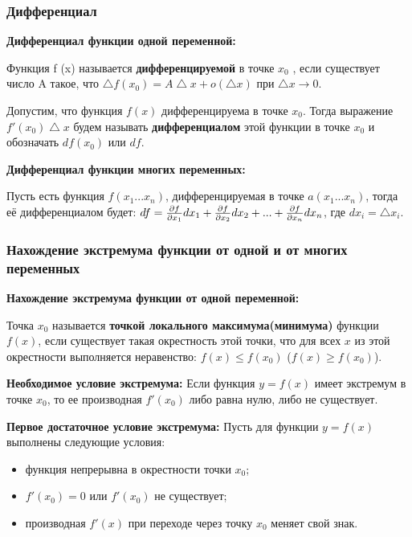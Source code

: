 \documentclass[12pt]{matmex-diploma}
\begin{document}
        \subsubsection*{Дифференциал}
        
            \textbf{Дифференциал функции одной переменной:}
        
            Функция f (x) называется \textbf{дифференцируемой} в точке $x_0$ , если существует число A такое, что $ \bigtriangleup f(x_0) = A \bigtriangleup x + o(\bigtriangleup x) $ при $\bigtriangleup x \to 0$.
            
            Допустим, что функция $f(x)$ дифференцируема в точке $x_0$. Тогда выражение $f'(x_0)\bigtriangleup x$ будем называть \textbf{дифференциалом} этой функции в точке $x_0$ и обозначать $df(x_0)$ или $df$.
            
            \textbf{Дифференциал функции многих переменных:}
            
            Пусть есть функция $f(x_1 ... x_n)$, дифференцируемая в точке $a(x_1 ... x_n)$, тогда её дифференциалом будет:
            $df = {\partial f \over \partial x_1}dx_1 + {\partial f \over \partial x_2}dx_2 + ... + {\partial f \over \partial x_n}dx_n$, где $dx_i = \bigtriangleup x_i$.
            
        \subsubsection*{Нахождение экстремума функции от одной и от многих переменных}
            
            \textbf{Нахождение экстремума функции от одной переменной:}
            
            Точка $x_0$ называется \textbf{точкой локального максимума(минимума)} функции $f(x)$, если существует такая окрестность этой точки, что для всех $x$ из этой окрестности выполняется неравенство: $f(x) \leq f(x_0)$ ($f(x) \geq f(x_0)$).
            
            \textbf{Необходимое условие экстремума:}
            Если функция $y = f(x)$ имеет экстремум в точке $x_0$, то ее производная $f'(x_0)$ либо равна нулю, либо не существует.
            
            \textbf{Первое достаточное условие экстремума:}
            Пусть для функции $y = f(x)$ выполнены следующие условия:
            \begin{itemize}
                \item функция непрерывна в окрестности точки $x_0$;
                \item $f'(x_0) = 0$ или $f'(x_0)$ не существует;
                \item производная $f'(x)$ при переходе через точку $x_0$ меняет свой знак.
            \end{itemize}
            
\end{document}

